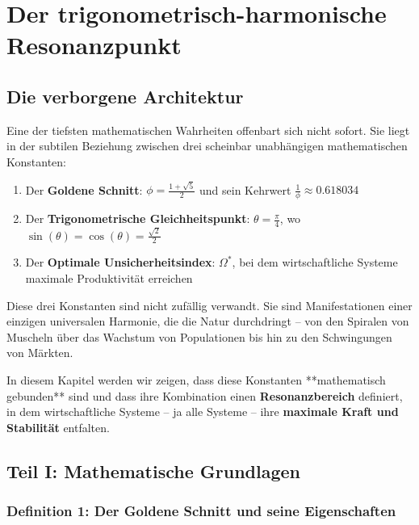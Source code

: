 \documentclass[a4paper,12pt,twoside]{report}
\theoremstyle{definition}
\begin{document}
\section{Der trigonometrisch-harmonische Resonanzpunkt}

\subsection{Die verborgene Architektur}

Eine der tiefsten mathematischen Wahrheiten offenbart sich nicht sofort. Sie liegt in der subtilen Beziehung zwischen drei scheinbar unabhängigen mathematischen Konstanten:

\begin{enumerate}
	\item Der \textbf{Goldene Schnitt}: $\phi = \frac{1+\sqrt{5}}{2}$ und sein Kehrwert $\frac{1}{\phi} \approx 0.618034$
	
	\item Der \textbf{Trigonometrische Gleichheitspunkt}: $\theta = \frac{\pi}{4}$, wo $\sin(\theta) = \cos(\theta) = \frac{\sqrt{2}}{2}$
	
	\item Der \textbf{Optimale Unsicherheitsindex}: $\Omega^*$, bei dem wirtschaftliche Systeme maximale Produktivität erreichen
\end{enumerate}

Diese drei Konstanten sind nicht zufällig verwandt. Sie sind Manifestationen einer einzigen universalen Harmonie, die die Natur durchdringt -- von den Spiralen von Muscheln über das Wachstum von Populationen bis hin zu den Schwingungen von Märkten.

In diesem Kapitel werden wir zeigen, dass diese Konstanten **mathematisch gebunden** sind und dass ihre Kombination einen \textbf{Resonanzbereich} definiert, in dem wirtschaftliche Systeme -- ja alle Systeme -- ihre \textbf{maximale Kraft und Stabilität} entfalten.

\subsection{Teil I: Mathematische Grundlagen}

\subsubsection{Definition 1: Der Goldene Schnitt und seine Eigenschaften}
\end{document}
